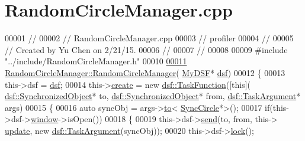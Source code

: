 \hypertarget{_random_circle_manager_8cpp_source}{}\section{Random\+Circle\+Manager.\+cpp}
\label{_random_circle_manager_8cpp_source}

\begin{DoxyCode}
00001 \textcolor{comment}{//}
00002 \textcolor{comment}{//  RandomCircleManager.cpp}
00003 \textcolor{comment}{//  profiler}
00004 \textcolor{comment}{//}
00005 \textcolor{comment}{//  Created by Yu Chen on 2/21/15.}
00006 \textcolor{comment}{//}
00007 \textcolor{comment}{//}
00008 
00009 \textcolor{preprocessor}{#include "../include/RandomCircleManager.h"}
00010 
\hypertarget{_random_circle_manager_8cpp_source_l00011}{}\hyperlink{class_random_circle_manager_aa16cf845cb91227bd58709fa4ee44c2c}{00011} \hyperlink{class_random_circle_manager_aa16cf845cb91227bd58709fa4ee44c2c}{RandomCircleManager::RandomCircleManager}(
      \hyperlink{class_my_d_s_f}{MyDSF}* \hyperlink{namespacedsf}{dsf})
00012 \{
00013     this->dsf = \hyperlink{class_random_circle_manager_acd654c100c962b48a97aff05fdf3aa5d}{dsf};
00014     this->\hyperlink{class_random_circle_manager_a5df9bb06afdb248a8400f4f708c16f0b}{create} = \textcolor{keyword}{new} \hyperlink{namespacedsf_aa16e735f29587f4485b56fc46746f7a9}{dsf::TaskFunction}([\textcolor{keyword}{this}](
      \hyperlink{classdsf_1_1_synchronized_object}{dsf::SynchronizedObject}* to, \hyperlink{classdsf_1_1_synchronized_object}{dsf::SynchronizedObject}* from, 
      \hyperlink{classyc_1_1_any}{dsf::TaskArgument}* args)
00015                                          \{
00016                                              \textcolor{keyword}{auto} syncObj = args->\hyperlink{classyc_1_1_any_a3db663604505ef8d7e84dd41d5bfcc75}{to}<
      \hyperlink{class_sync_circle}{SyncCircle}*>();
00017                                              \textcolor{keywordflow}{if}(this->dsf->\hyperlink{classdsf_1_1sfml_1_1_render_window_a2c04b61ca1bfba140120001c4a9a30e1}{window}->isOpen())
00018                                              \{
00019                                                  this->dsf->\hyperlink{classdsf_1_1_dual_state_framework_a3063d7f0ce537eb44dc2bdcec816a36b}{send}(to, from, this->
      \hyperlink{class_random_circle_manager_a05c52359eec88a70be1296bfbeeb17c7}{update}, \textcolor{keyword}{new} \hyperlink{classyc_1_1_any}{dsf::TaskArgument}(syncObj));
00020                                                  this->dsf->\hyperlink{classdsf_1_1_lock_ae521388d861fe66b9c6e2f09811b0d4b}{lock}();

\end{DoxyCode}
